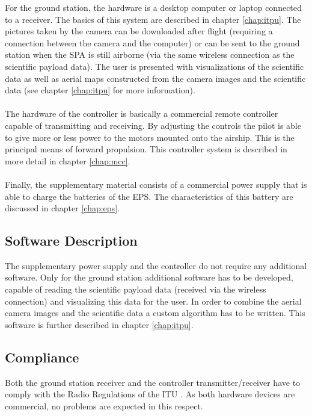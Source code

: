 For the ground station, the hardware is a desktop computer or laptop connected to a receiver. The basics of this system are described in chapter \ref{chap:itpu}. The pictures taken by the camera can be downloaded after flight (requiring a connection between the camera and the computer) or can be sent to the ground station when the \ac{SPA} is still airborne (via the same wireless connection as the scientific payload data). The user is presented with visualizations of the scientific data as well as aerial maps constructed from the camera images and the scientific data (see chapter \ref{chap:itpu} for more information).
\\
\\
The hardware of the controller is basically a commercial remote controller capable of transmitting and receiving. By adjusting the controls the pilot is able to give more or less power to the motors mounted onto the airship. This is the principal means of forward propulsion. This controller system is described in more detail in chapter \ref{chap:mcc}.
\\
\\
Finally, the supplementary material consists of a commercial power supply that is able to charge the batteries of the \ac{EPS}. The characteristics of this battery are discussed in chapter \ref{chap:eps}.

\subsection{Software Description}

The supplementary power supply and the controller do not require any additional software. Only for the ground station additional software has to be developed, capable of reading the scientific payload data (received via the wireless connection) and visualizing this data for the user. In order to combine the aerial camera images and the scientific data a custom algorithm has to be written. This software is further described in chapter \ref{chap:itpu}.

\subsection{Compliance}

Both the ground station receiver and the controller transmitter/receiver have to comply with the Radio Regulations of the \ac{ITU} \cite{book:freqalloc}. As both hardware devices are commercial, no problems are expected in this respect.

